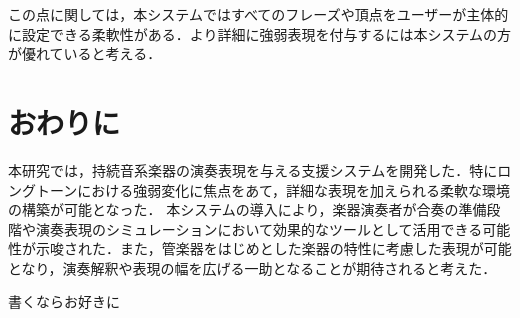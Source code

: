 この点に関しては，本システムではすべてのフレーズや頂点をユーザーが主体的に設定できる柔軟性がある．より詳細に強弱表現を付与するには本システムの方が優れていると考える．


\section{おわりに}
本研究では，持続音系楽器の演奏表現を与える支援システムを開発した．特にロングトーンにおける強弱変化に焦点をあて，詳細な表現を加えられる柔軟な環境の構築が可能となった．
本システムの導入により，楽器演奏者が合奏の準備段階や演奏表現のシミュレーションにおいて効果的なツールとして活用できる可能性が示唆された．また，管楽器をはじめとした楽器の特性に考慮した表現が可能となり，演奏解釈や表現の幅を広げる一助となることが期待されると考えた．





\begin{acknowledgment}
書くならお好きに
\end{acknowledgment}
